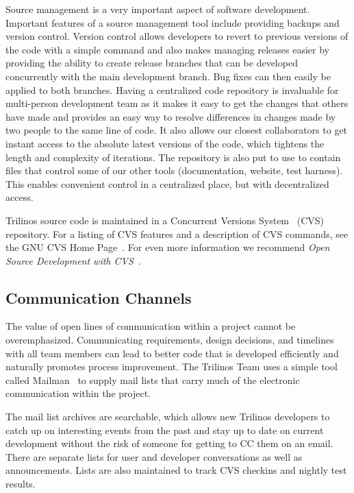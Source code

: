 \documentclass[12pt,relax]{article}
\begin{document}

Source management is a very important aspect of software development. 
Important features of a source management tool include providing backups and
version control.  Version control allows developers to revert to previous
versions of the code with a simple command and also makes managing releases
easier by providing the ability to create release branches that can be
developed concurrently with the main development branch.  Bug fixes can then
easily be applied to both branches.  Having a centralized code repository is
invaluable for multi-person development team as it makes it easy to get the
changes that others have made and provides an easy way to resolve differences
in changes made by two people to the same line of code.  It also allows our
closest collaborators to get instant access to the absolute latest versions
of the code, which tightens the length and complexity of iterations.  The
repository is also put to use to contain files that control some of our other
tools (documentation, website, test harness).  This enables convenient control
in a centralized place, but with decentralized access.

Trilinos source code is maintained in a Concurrent Versions System~\cite{CVS}
(CVS) repository.  For a listing of CVS features and a description of 
CVS commands, see the GNU CVS Home Page~\cite{CVS}.  For even more information
we recommend {\it Open Source Development with CVS}~\cite{FogelBarCVS}.

\subsection{Communication Channels}


The value of open lines of communication within a project cannot be 
overemphasized.  Communicating requirements, design decisions, and timelines 
with all team members can lead to better code that is developed efficiently
and naturally promotes process improvement.  The Trilinos Team uses a simple 
tool called Mailman~\cite{Mailman} to supply mail lists that carry much 
of the electronic communication within the project.

The mail list archives are searchable, which allows new Trilinos developers 
to catch up on interesting events from the past and stay up to date on current
development without the risk of someone for getting to CC them on an email.  
There are separate lists for user and developer conversations as well as
announcements.  Lists are also maintained to track CVS checkins and nightly 
test results.
\end{document}
